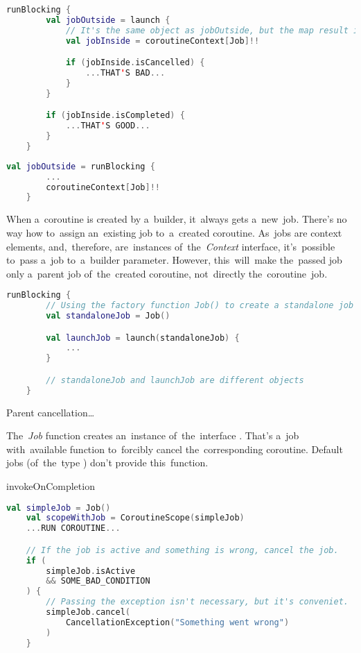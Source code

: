 \begin{lstlisting}[language=Kotlin]
    runBlocking {
        val jobOutside = launch {
            // It's the same object as jobOutside, but the map result is nullable
            val jobInside = coroutineContext[Job]!!

            if (jobInside.isCancelled) {
                ...THAT'S BAD...
            }
        }

        if (jobInside.isCompleted) {
            ...THAT'S GOOD...
        }
    }
\end{lstlisting}

\begin{lstlisting}[language=Kotlin]
    val jobOutside = runBlocking {
        ...
        coroutineContext[Job]!!
    }
\end{lstlisting}

\warning When a~coroutine is created by a~builder, it~always gets a~new~job.
There's no way how to~assign an~existing job to~a~created coroutine.
As~jobs are context elements, and,~therefore, are~instances \mbox{of the \textit{Context}} interface, it's~possible to~pass a~job to~a~builder parameter.
However, this~will~make the~passed job only a~parent job of~the~created coroutine, not~directly the~coroutine~job.

\begin{lstlisting}[language=Kotlin]
    runBlocking {
        // Using the factory function Job() to create a standalone job
        val standaloneJob = Job()

        val launchJob = launch(standaloneJob) {
            ...
        }

        // standaloneJob and launchJob are different objects
    }
\end{lstlisting}

\warning Parent cancellation\ldots

\note \mbox{The \textit{Job}} function creates an~instance of~the~interface .
That's a~job with~available function  to~forcibly cancel the~corresponding coroutine.
Default jobs (of~the~type ) don't provide this~function.

\todo invokeOnCompletion

\begin{lstlisting}[language=Kotlin]
    val simpleJob = Job()
    val scopeWithJob = CoroutineScope(simpleJob)
    ...RUN COROUTINE...

    // If the job is active and something is wrong, cancel the job.
    if (
        simpleJob.isActive
        && SOME_BAD_CONDITION
    ) {
        // Passing the exception isn't necessary, but it's conveniet.
        simpleJob.cancel(
            CancellationException("Something went wrong")
        )
    }
\end{lstlisting}

\label{kotlincoroutinedispatcher}
